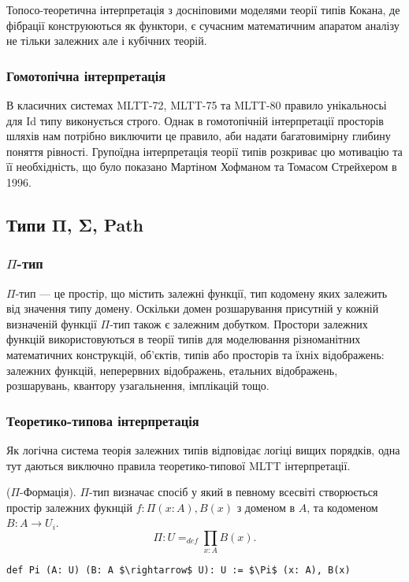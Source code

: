 Топосо-теоретична інтерпретація з досніповими моделями теорії типів Кокана,
де фібрації конструюються як функтори, є сучасним математичним апаратом
аналізу не тільки залежних але і кубічних теорій.

\subsubsection{Гомотопічна інтерпретація}
В класичних системах MLTT-72, MLTT-75 та MLTT-80 правило унікальносьі для
Id типу виконується строго. Однак в гомотопічній інтерпретації просторів шляхів
нам потрібно виключити це правило, аби надати багатовимірну глибину поняття рівності.
Групоїдна інтерпретація теорії типів розкриває цю мотивацію та її необхідність, що
було показано Мартіном Хофманом та Томасом Стрейхером в 1996.

\newpage
\subsection{Типи Π, Σ, Path}

\subsubsection{$\Pi$-тип}
$\Pi$-тип --- це простір, що містить залежні функції, тип кодомену
яких залежить від значення типу домену. Оскільки домен розшарування
присутній у кожній визначеній функції $\Pi$-тип також є залежним добутком.
Простори залежних функцій використовуються в теорії типів для моделювання
різноманітних математичних конструкцій, об’єктів, типів або
просторів та їхніх відображень: залежних функцій, неперервних відображень,
етальних відображень, розшарувань, квантору узагальнення, імплікацій тощо.

\subsubsection*{Теоретико-типова інтерпретація}
Як логічна система теорія залежних типів відповідає логіці вищих порядків,
одна тут даються виключно правила теоретико-типової MLTT інтерпретації.

\begin{definition} ($\Pi$-Формація). $\Pi$-тип визначає спосіб у який
в певному всесвіті створюється простір залежних фукнцій $f: \Pi(x:A), B(x)$ з
доменом в $A$, та кодоменом $B: A \rightarrow U_i$.
$$\Pi : U =_{def} \prod_{x:A}B(x).$$
\begin{lstlisting}
def Pi (A: U) (B: A $\rightarrow$ U): U := $\Pi$ (x: A), B(x)
\end{lstlisting}
\end{definition}

